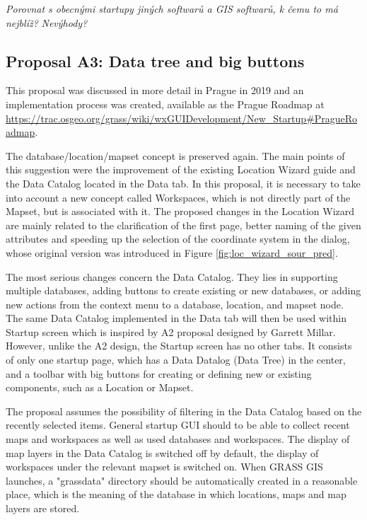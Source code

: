 \documentclass[a4paper,10pt,twoside]{article}
\begin{document}
\textit{\color{red} Porovnat s obecnými startupy jiných softwarů a GIS softwarů, k čemu to má nejblíž?}
\textit{\color{red} Nevýhody?}

\subsection{Proposal A3: Data tree and big buttons}

This proposal was discussed in more detail in Prague in 2019 and an implementation process was created, available as the Prague Roadmap at \url{https://trac.osgeo.org/grass/wiki/wxGUIDevelopment/New\_Startup\#PragueRoadmap}.

The database/location/mapset concept is preserved again. The main points of this suggestion were the improvement of the existing Location Wizard guide and the Data Catalog located in the Data tab. In this proposal, it is necessary to take into account a new concept called Workspaces, which is not directly part of the Mapset, but is associated with it. The proposed changes in the Location Wizard are mainly related to the clarification of the first page, better naming of the given attributes and speeding up the selection of the coordinate system in the dialog, whose original version was introduced in Figure \ref{fig:loc_wizard_sour_pred}.

The most serious changes concern the Data Catalog. They lies in supporting multiple databases, adding buttons to create existing or new databases, or adding new actions from the context menu to a database, location, and mapset node. The same Data Catalog implemented in the Data tab will then be used within Startup screen which is inspired by A2 proposal designed by Garrett Millar. However, unlike the A2 design, the Startup screen has no other tabs. It consists of only one startup page, which has a Data Datalog (Data Tree) in the center, and a toolbar with big buttons for creating or defining new or existing components, such as a Location or Mapset. 

The proposal assumes the possibility of filtering in the Data Catalog based on the recently selected items. General startup GUI should to be able to collect recent maps and workspaces as well as used databases and workspaces. The display of map layers in the Data Catalog is switched off by default, the display of workspaces under the relevant mapset is switched on. When GRASS GIS launches, a "grassdata" directory should be automatically created in a reasonable place, which is the meaning of the database in which locations, maps and map layers are stored.
\end{document}
